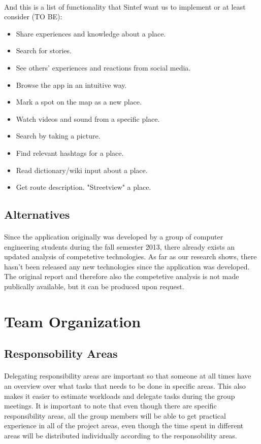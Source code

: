 \documentclass[12pt,a4paper,titlepage]{article}
\begin{document}
				\paragraph{}
And this is a list of functionality that Sintef want us to implement or at least consider (TO BE):
				\begin{itemize}
\item Share experiences and knowledge about a place.
\item Search for stories.
\item See others' experiences and reactions from social media.
\item Browse the app in an intuitive way.
\item Mark a spot on the map as a new place.
\item Watch videos and sound from a specific place.
\item Search by taking a picture.
\item Find relevant hashtags for a place.
\item Read dictionary/wiki input about a place.
\item Get route description.
"Streetview" a place.
				\end{itemize}
			\subsection{Alternatives}
				\paragraph{}
Since the application originally was developed by a group of computer engineering students during the fall semester 2013, there already exists an updated analysis of competetive technologies. As far as our research shows, there hasn't been released any new technologies since the application was developed. The original report and therefore also the competetive analysis is not made publically available, but it can be produced upon request. 
		
		\section{Team Organization}
			\subsection{Responsobility Areas}
				\paragraph{}
Delegating responsibility areas are important so that someone at all times have an overview over what tasks that needs to be done in specific areas. This also makes it easier to estimate workloads and delegate tasks during the group meetings. It is important to note that even though there are specific responsibility areas, all the group members will be able to get practical experience in all of the project areas, even though the time spent in different areas will be distributed individually according to the responsobility areas.
\end{document}
